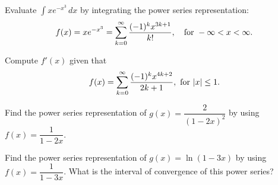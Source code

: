 \documentclass[../mathNotesPreamble]{subfiles}
\begin{document}
  \begin{ex*}[\textcolor{blue}{LC 29.5}]
    Evaluate $\displaystyle\int xe^{-x^3}\,dx$ by integrating the power series representation:
      \[f(x)=xe^{-x^3}=\sum_{k=0}^\infty \frac{(-1)^k x^{3k+1}}{k!},\quad\textnormal{for }-\infty<x<\infty.\]
  \end{ex*}
  \pagebreak

  \begin{ex*}[\textcolor{blue}{LC 29.6}]
    Compute $f'(x)$ given that
      \[f(x)=\sum_{k=0}^\infty \frac{(-1)^kx^{4k+2}}{2k+1},\textnormal{ for }{\left\vert x\right\vert}\leq1.\]
  \end{ex*}
  \pagebreak

  \begin{ex*}[\textcolor{blue}{LC 29.7}]
    Find the power series representation of $g(x)=\dfrac{2}{(1-2x)^2}$ by using $f(x)=\dfrac{1}{1-2x}$.
  \end{ex*}
  \pagebreak

  \begin{ex*}[\textcolor{blue}{LC 29.8-29.10}]
    Find the power series representation of $g(x)=\ln(1-3x)$ by using $f(x)=\dfrac{1}{1-3x}$. What is the interval of convergence of this power series?
  \end{ex*}
  \pagebreak
\end{document}
